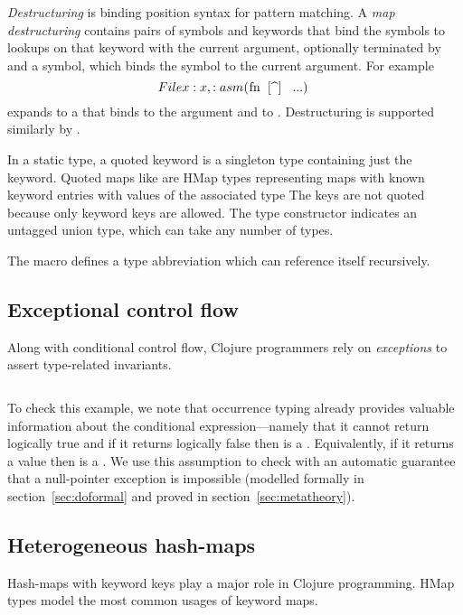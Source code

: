 \emph{Destructuring} is binding position syntax for pattern matching.
A \emph{map destructuring} contains pairs of symbols and keywords that bind the symbols
to lookups on that keyword with the current argument, optionally terminated by
 and a symbol, which binds the symbol to the current argument. For example
$$
\clj{(fn [{^File x :x, :as m}] ...)}
$$ 
expands to a  that binds  to the argument and 
 to .
Destructuring is supported similarly by .

In a static type, a quoted keyword  is a singleton type containing just the keyword.
Quoted maps like  are HMap types representing
maps with known keyword entries with values of the associated type
The keys are not quoted because only keyword keys
are allowed. The type constructor  indicates an untagged union type, which can take
any number of types.

The  macro defines a type abbreviation which can reference itself recursively.

\subsection{Exceptional control flow}

Along with conditional control flow,
Clojure programmers rely on \emph{exceptions}
to assert type-related invariants.

\begin{exmp}
\inputminted[firstline=13,lastline=15]{clojure}{code/demo/src/demo/do.clj}
\label{example:doexception}
\end{exmp}

To check this example, we note that
occurrence typing already provides
valuable information about the conditional expression---namely that it cannot return logically true and if it returns logically false 
then  is a . Equivalently, if it returns a value then  is a .
We use this assumption to check  with an automatic
guarantee that a null-pointer exception is impossible
(modelled formally in section~\ref{sec:doformal} and proved
in section~\ref{sec:metatheory}).

\subsection{Heterogeneous hash-maps}

Hash-maps with keyword keys play a major role in Clojure programming.
HMap types model the most common usages of keyword maps.

